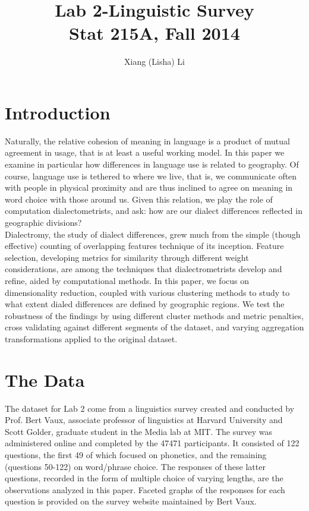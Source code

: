 \documentclass{article}\usepackage[]{graphicx}\usepackage[]{color}
\begin{document}
\title{Lab 2-Linguistic Survey\\
Stat 215A, Fall 2014}

\author{Xiang (Lisha) Li}

\maketitle


\section{Introduction}

Naturally, the relative cohesion of meaning in language is a product of mutual agreement in usage, that is at least a useful working model.  In this paper we examine in particular how differences in language use is related to geography.  Of course, language use is tethered to where we live, that is, we communicate often with people in physical proximity and are thus inclined to agree on meaning in word choice with those around us.  Given this relation, we play the role of computation dialectometrists, and ask: how are our dialect differences reflected in geographic divisions? \\

Dialectromy, the study of dialect differences, grew much from the simple (though effective) counting of overlapping features technique of its inception. Feature selection, developing  metrics for similarity through different weight considerations, are among the techniques that dialectrometrists develop and refine, aided by computational methods.  In this paper, we focus on dimensionality reduction, coupled with various clustering methods to study to what extent dialed differences are defined by geographic regions.  We test the robustness of the findings by using different cluster methods and metric penalties, cross validating against different segments of the dataset, and varying aggregation transformations applied to the original dataset. 
\\

\section{The Data}

The dataset for Lab 2 come from a linguistics survey created and conducted by Prof. Bert Vaux, associate professor of linguistics at Harvard University and Scott Golder, graduate student in the Media lab at MIT.  The survey was administered online and completed by the 47471 participants.  It consisted of 122 questions, the first 49 of which focused on phonetics, and the remaining (questions 50-122) on word/phrase choice.  The responses of these latter questions, recorded in the form of multiple choice of varying lengths, are the observations analyzed in this paper.  Faceted graphs of the responses for each question is provided on the survey website maintained by Bert Vaux.   
\end{document}
